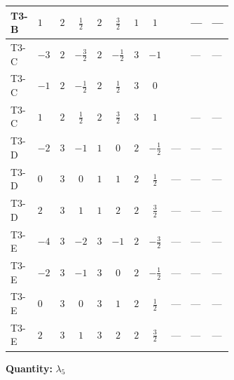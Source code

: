 \documentclass[8pt]{article}
\begin{document}
\begin{landscape}
\begin{longtable}{@{}llcccccc >{\raggedright\arraybackslash}p{0.21\linewidth} >{\raggedright\arraybackslash}p{0.21\linewidth} >{\raggedright\arraybackslash}p{0.21\linewidth}@{}}
\midrule
T3-B & $1$ & $2$ & $\frac{1}{2}$ & $2$ & $\frac{3}{2}$ & $1$ & $1$ & \scriptsize\adjustbox{max width=\linewidth}{$\begin{gathered} -9 {g_1}^2 {\lambda_5}\end{gathered}$} & --- & --- \\
\midrule
T3-C & $-3$ & $2$ & $-\frac{3}{2}$ & $2$ & $-\frac{1}{2}$ & $3$ & $-1$ & \scriptsize\adjustbox{max width=\linewidth}{$\begin{gathered} -9 {g_1}^2 {\lambda_5}\end{gathered}$} & --- & --- \\
\midrule
T3-C & $-1$ & $2$ & $-\frac{1}{2}$ & $2$ & $\frac{1}{2}$ & $3$ & $0$ & \scriptsize\adjustbox{max width=\linewidth}{$\begin{gathered} -3 {g_1}^2 {\lambda_5}\end{gathered}$} & \scriptsize\adjustbox{max width=\linewidth}{$\begin{gathered} +3 \left({\lambda_{7}}\right)^{*} \operatorname{Tr}\!\left({y_2}\,\left({y_1}\right)^{\dagger}\right)\end{gathered}$} & \scriptsize\adjustbox{max width=\linewidth}{$\begin{gathered} +3 \left({\lambda_{8}}\right)^{*} \operatorname{Tr}\!\left({y_1}\,\left({y_2}\right)^{\dagger}\right)\end{gathered}$} \\
\midrule
T3-C & $1$ & $2$ & $\frac{1}{2}$ & $2$ & $\frac{3}{2}$ & $3$ & $1$ & \scriptsize\adjustbox{max width=\linewidth}{$\begin{gathered} -9 {g_1}^2 {\lambda_5}\end{gathered}$} & --- & --- \\
\midrule
T3-D & $-2$ & $3$ & $-1$ & $1$ & $0$ & $2$ & $-\frac{1}{2}$ & --- & --- & --- \\
\midrule
T3-D & $0$ & $3$ & $0$ & $1$ & $1$ & $2$ & $\frac{1}{2}$ & --- & --- & --- \\
\midrule
T3-D & $2$ & $3$ & $1$ & $1$ & $2$ & $2$ & $\frac{3}{2}$ & --- & --- & --- \\
\midrule
T3-E & $-4$ & $3$ & $-2$ & $3$ & $-1$ & $2$ & $-\frac{3}{2}$ & --- & --- & --- \\
\midrule
T3-E & $-2$ & $3$ & $-1$ & $3$ & $0$ & $2$ & $-\frac{1}{2}$ & --- & --- & --- \\
\midrule
T3-E & $0$ & $3$ & $0$ & $3$ & $1$ & $2$ & $\frac{1}{2}$ & --- & --- & --- \\
\midrule
T3-E & $2$ & $3$ & $1$ & $3$ & $2$ & $2$ & $\frac{3}{2}$ & --- & --- & --- \\
\midrule
\bottomrule
\end{longtable}
\clearpage
\noindent\textbf{Quantity: }$\lambda_5$\par\smallskip

\end{landscape}
\end{document}

